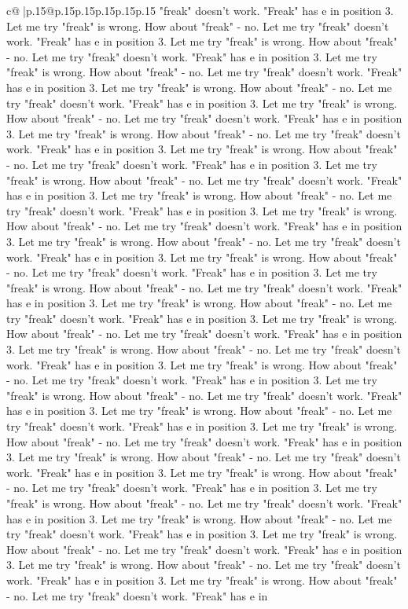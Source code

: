 \documentclass{article}
\begin{document}
{\begin{supertabular}{c@{$\;$}|p{.15\linewidth}@{}p{.15\linewidth}p{.15\linewidth}p{.15\linewidth}p{.15\linewidth}p{.15\linewidth}}
{{{"freak" doesn't work. "Freak" has e in position 3. Let me try "freak" is wrong. How about "freak" {-} no. Let me try "freak" doesn't work. "Freak" has e in position 3. Let me try "freak" is wrong. How about "freak" {-} no. Let me try "freak" doesn't work. "Freak" has e in position 3. Let me try "freak" is wrong. How about "freak" {-} no. Let me try "freak" doesn't work. "Freak" has e in position 3. Let me try "freak" is wrong. How about "freak" {-} no. Let me try "freak" doesn't work. "Freak" has e in position 3. Let me try "freak" is wrong. How about "freak" {-} no. Let me try "freak" doesn't work. "Freak" has e in position 3. Let me try "freak" is wrong. How about "freak" {-} no. Let me try "freak" doesn't work. "Freak" has e in position 3. Let me try "freak" is wrong. How about "freak" {-} no. Let me try "freak" doesn't work. "Freak" has e in position 3. Let me try "freak" is wrong. How about "freak" {-} no. Let me try "freak" doesn't work. "Freak" has e in position 3. Let me try "freak" is wrong. How about "freak" {-} no. Let me try "freak" doesn't work. "Freak" has e in position 3. Let me try "freak" is wrong. How about "freak" {-} no. Let me try "freak" doesn't work. "Freak" has e in position 3. Let me try "freak" is wrong. How about "freak" {-} no. Let me try "freak" doesn't work. "Freak" has e in position 3. Let me try "freak" is wrong. How about "freak" {-} no. Let me try "freak" doesn't work. "Freak" has e in position 3. Let me try "freak" is wrong. How about "freak" {-} no. Let me try "freak" doesn't work. "Freak" has e in position 3. Let me try "freak" is wrong. How about "freak" {-} no. Let me try "freak" doesn't work. "Freak" has e in position 3. Let me try "freak" is wrong. How about "freak" {-} no. Let me try "freak" doesn't work. "Freak" has e in position 3. Let me try "freak" is wrong. How about "freak" {-} no. Let me try "freak" doesn't work. "Freak" has e in position 3. Let me try "freak" is wrong. How about "freak" {-} no. Let me try "freak" doesn't work. "Freak" has e in position 3. Let me try "freak" is wrong. How about "freak" {-} no. Let me try "freak" doesn't work. "Freak" has e in position 3. Let me try "freak" is wrong. How about "freak" {-} no. Let me try "freak" doesn't work. "Freak" has e in position 3. Let me try "freak" is wrong. How about "freak" {-} no. Let me try "freak" doesn't work. "Freak" has e in position 3. Let me try "freak" is wrong. How about "freak" {-} no. Let me try "freak" doesn't work. "Freak" has e in position 3. Let me try "freak" is wrong. How about "freak" {-} no. Let me try "freak" doesn't work. "Freak" has e in position 3. Let me try "freak" is wrong. How about "freak" {-} no. Let me try "freak" doesn't work. "Freak" has e in position 3. Let me try "freak" is wrong. How about "freak" {-} no. Let me try "freak" doesn't work. "Freak" has e in position 3. Let me try "freak" is wrong. How about "freak" {-} no. Let me try "freak" doesn't work. "Freak" has e in position 3. Let me try "freak" is wrong. How about "freak" {-} no. Let me try "freak" doesn't work. "Freak" has e in position 3. Let me try "freak" is wrong. How about "freak" {-} no. Let me try "freak" doesn't work. "Freak" has e in }}}
\end{supertabular}}
\end{document}
